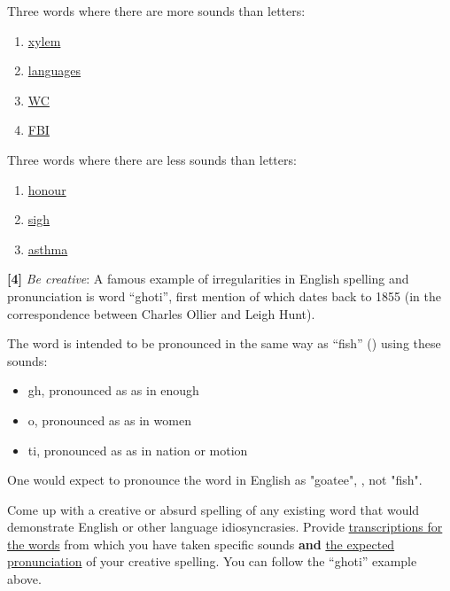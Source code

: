 \documentclass{../labbook}
\begin{document}
\begin{solution}
Three words where there are more sounds than letters:
\begin{enumerate}
    \item \underline{xylem}
    \item \underline{languages}
    \item \underline{WC}
    \item \underline{FBI}
\end{enumerate}
\bigskip

Three words where there are less sounds than letters:
\begin{enumerate}
    \item \underline{honour}
    \item \underline{sigh}
    \item \underline{asthma}
\end{enumerate}

\end{solution}
\begin{problem}{3}
\textbf{[4]} \textit{Be creative}: A famous example of irregularities in English spelling and pronunciation is word “ghoti”, first mention of which dates back to 1855 (in the correspondence between Charles Ollier and Leigh Hunt).

The word is intended to be pronounced in the same way as ``fish'' () using these sounds:
\begin{itemize}
    \item gh, pronounced as  as in enough 
    \item o, pronounced as  as in women 
    \item ti, pronounced as  as in nation  or motion 
\end{itemize}


One would expect to pronounce the word in English as "goatee", , not "fish".

Come up with a creative or absurd spelling of any existing word that would demonstrate English or other language idiosyncrasies. Provide \underline{transcriptions for the words} from which you have taken specific sounds \textbf{and} \underline{the expected pronunciation} of your creative spelling. You can follow the “ghoti” example above.

\end{problem}
\end{document}
